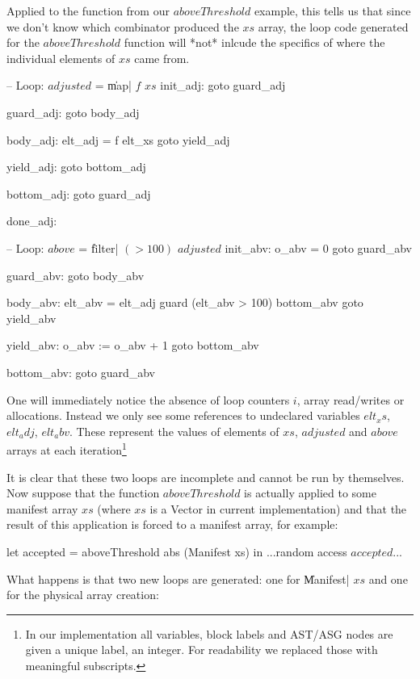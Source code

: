 \documentclass[preamble.tex]{subfiles}
\begin{document}
Applied to the function from our $aboveThreshold$ example, this tells us that since we don't know which combinator produced the $xs$ array, the loop code generated for the $aboveThreshold$ function will *not* inlcude the specifics of where the individual elements of $xs$ came from.

\begin{loopcode}
  -- Loop: $adjusted$ = \|map| $f$ $xs$
  init_adj:
    goto guard_adj

  guard_adj:
    goto body_adj

  body_adj:
    elt_adj = f elt_xs
    goto yield_adj

  yield_adj:
    goto bottom_adj

  bottom_adj:
    goto guard_adj

  done_adj:


  -- Loop: $above$ = \|filter| $(>100)$ $adjusted$
  init_abv:
    o_abv = 0
    goto guard_abv

  guard_abv:
    goto body_abv

  body_abv:
    elt_abv = elt_adj
    guard (elt_abv > 100) bottom_abv
    goto yield_abv

  yield_abv:
    o_abv := o_abv + 1
    goto bottom_abv

  bottom_abv:
    goto guard_abv
\end{loopcode}

One will immediately notice the absence of loop counters $i$, array read/writes or allocations. Instead we only see some references to undeclared variables $elt_xs$, $elt_adj$, $elt_abv$. These represent the values of elements of $xs$, $adjusted$ and $above$ arrays at each iteration\footnote{In our implementation all variables, block labels and AST/ASG nodes are given a unique label, an integer. For readability we replaced those with meaningful subscripts.}

It is clear that these two loops are incomplete and cannot be run by themselves. Now suppose that the function $aboveThreshold$ is actually applied to some manifest array $xs$ (where $xs$ is a Vector in current implementation) and that the result of this application is forced to a manifest array, for example:
\begin{hscode}
let accepted = aboveThreshold abs (Manifest xs)
in  ...random access $accepted$...
\end{hscode}

What happens is that two new loops are generated: one for \|Manifest| $xs$ and one for the physical array creation:
\end{document}
